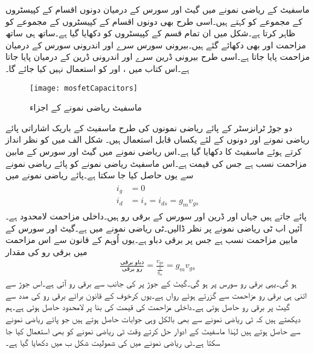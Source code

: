 ماسفیٹ کے ریاضی نمونے میں  گیٹ اور سورس کے درمیان دونوں اقسام کے کپیسٹروں کے مجموعے کو کہتے ہیں۔اسی طرح  بھی دونوں اقسام کے کپیسٹروں کے مجموعے کو ظاہر کرتا ہے۔شکل  میں ان تمام قسم کے کپیسٹروں کو دکھایا گیا ہے۔ساتھ ہی ساتھ مزاحمت  اور  بھی دکھائے گئے ہیں۔بیرونی سورس سرے اور اندرونی سورس کے درمیان  مزاحمت پایا جاتا ہے۔اسی طرح بیرونی ڈرین سرے اور اندرونی ڈرین کے درمیان  پایا جاتا ہے۔اس کتاب میں ،  اور  کو  استعمال نہیں کیا جائے گا۔
\begin{figure}
\centering
\texttt{[image: mosfetCapacitors]}
\caption{ماسفیٹ ریاضی نمونے کے اجزاء}
\label{شکل_ماسفیٹ_ماڈل_اجزاء}
\end{figure}

دو جوڑ ٹرانزسٹر کے پائے ریاضی نمونوں کی طرح ماسفیٹ کے باریک اشاراتی پائے ریاضی نمونے  اور  دونوں کے لئے یکساں قابل استعمال ہیں۔
شکل  الف میں  کو نظر انداز کرتے ہوئے ماسفیٹ کا  دکھایا گیا ہے۔اس ریاضی نمونے میں گیٹ اور سورس کے مابین مزاحمت نسب ہے جس کی قیمت  ہے۔اس ماسفیٹ ریاضی نمونے کو پائے ریاضی نمونے سے یوں حاصل کیا جا سکتا ہے۔پائے ریاضی نمونے میں
\begin{gather} 
\begin{aligned}\label{مساوات_ماسفیٹ_ٹی_ماڈل_کے_برقی_رو}
i_g&=0\\
i_d&=i_s=i_{ds}=g_m v_{gs}
\end{aligned}
\end{gather}
پائے جاتے ہیں جہاں  اور  ڈرین اور سورس کے برقی رو ہیں۔داخلی مزاحمت لامحدود ہے۔آئیں اب ٹی ریاضی نمونے پر نظر ڈالیں۔ٹی ریاضی نمونے میں  ہے۔گیٹ اور سورس کے مابین مزاحمت نسب ہے جس پر برقی دباو  ہے۔یوں اُوہم کے قانون سے اس مزاحمت میں برقی رو کی مقدار
\begin{align*}
\frac{\textrm{دباو برقی}}{\textrm{رو برقی}}=\frac{v_{gs}}{\frac{1}{g_m}}=g_m v_{gs}
\end{align*} 
ہو گی۔یہی برقی رو سورس پر ہو گی۔گیٹ  کے جوڑ پر  کی جانب سے  برقی رو آتی ہے۔اس جوڑ سے اتنی ہی برقی رو مزاحمت سے گزرتے ہوئے  رواں ہے۔یوں کرخوف کے قانون برائے برقی رو کی مدد سے گیٹ  پر برقی رو  حاصل ہوتی ہے۔داخلی مزاحمت  کی قیمت  کی بنا پر لامحدود حاصل ہوتی ہے۔ہم دیکھتے ہیں کہ ٹی ریاضی نمونے سے بھی بالکل وہی جوابات حاصل ہوتے ہیں جو پائے ریاضی نمونے سے حاصل ہوتے ہیں لہٰذا ماسفیٹ کے ادوار حل کرتے وقت ٹی ریاضی نمونے کو بھی استعمال کیا جا سکتا ہے۔ٹی ریاضی نمونے میں  کی شمولیت شکل  ب میں دکھایا گیا ہے۔ 

